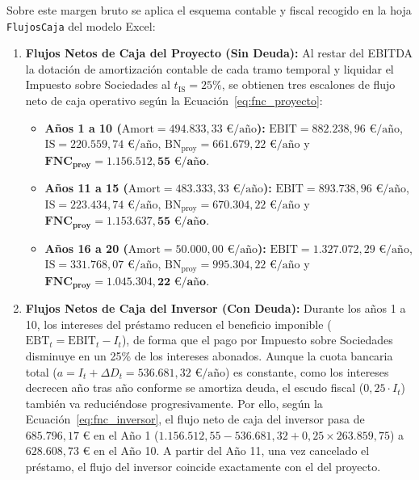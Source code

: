 \documentclass[a4paper,11pt]{report}
\providecommand{\euro}{€}
\begin{document}
Sobre este margen bruto se aplica el esquema contable y fiscal recogido en la hoja \texttt{FlujosCaja} del modelo Excel:
\begin{enumerate}
    \item \textbf{Flujos Netos de Caja del Proyecto (Sin Deuda):} Al restar del EBITDA la dotación de amortización contable de cada tramo temporal y liquidar el Impuesto sobre Sociedades al $t_{\text{IS}} = 25\%$, se obtienen tres escalones de flujo neto de caja operativo según la Ecuación~\eqref{eq:fnc_proyecto}:
    \begin{itemize}
        \item \textbf{Años 1 a 10 ($\text{Amort} = 494.833,33\text{ \euro/año}$):} $\text{EBIT} = 882.238,96\text{ \euro/año}$, $\text{IS} = 220.559,74\text{ \euro/año}$, $\text{BN}_{\text{proy}} = 661.679,22\text{ \euro/año}$ y $\mathbf{FNC_{\text{proy}} = 1.156.512,55\text{ \euro/año}}$.
        \item \textbf{Años 11 a 15 ($\text{Amort} = 483.333,33\text{ \euro/año}$):} $\text{EBIT} = 893.738,96\text{ \euro/año}$, $\text{IS} = 223.434,74\text{ \euro/año}$, $\text{BN}_{\text{proy}} = 670.304,22\text{ \euro/año}$ y $\mathbf{FNC_{\text{proy}} = 1.153.637,55\text{ \euro/año}}$.
        \item \textbf{Años 16 a 20 ($\text{Amort} = 50.000,00\text{ \euro/año}$):} $\text{EBIT} = 1.327.072,29\text{ \euro/año}$, $\text{IS} = 331.768,07\text{ \euro/año}$, $\text{BN}_{\text{proy}} = 995.304,22\text{ \euro/año}$ y $\mathbf{FNC_{\text{proy}} = 1.045.304,22\text{ \euro/año}}$.
    \end{itemize}
    \item \textbf{Flujos Netos de Caja del Inversor (Con Deuda):} Durante los años 1 a 10, los intereses del préstamo reducen el beneficio imponible ($\text{EBT}_t = \text{EBIT}_t - I_t$), de forma que el pago por Impuesto sobre Sociedades disminuye en un 25\% de los intereses abonados. Aunque la cuota bancaria total ($a = I_t + \Delta D_t = 536.681,32\text{ \euro/año}$) es constante, como los intereses decrecen año tras año conforme se amortiza deuda, el escudo fiscal ($0,25 \cdot I_t$) también va reduciéndose progresivamente. Por ello, según la Ecuación~\eqref{eq:fnc_inversor}, el flujo neto de caja del inversor pasa de $685.796,17\text{ \euro}$ en el Año 1 ($1.156.512,55 - 536.681,32 + 0,25 \times 263.859,75$) a $628.608,73\text{ \euro}$ en el Año 10. A partir del Año 11, una vez cancelado el préstamo, el flujo del inversor coincide exactamente con el del proyecto.
\end{enumerate}
\end{document}
